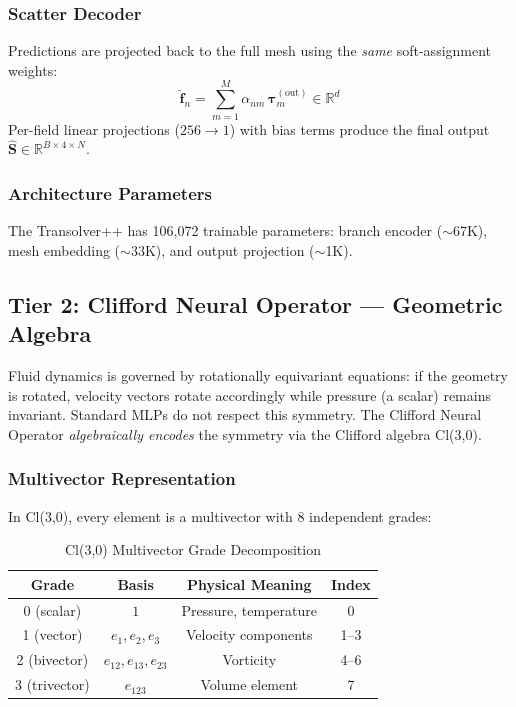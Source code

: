\documentclass[journal]{IEEEtran}
\begin{document}
\subsubsection{Scatter Decoder}
Predictions are projected back to the full mesh using the \emph{same} soft-assignment weights:
\begin{equation}
\hat{\bm{f}}_n = \sum_{m=1}^{M} \alpha_{nm}\,\bm{\tau}_m^{(\text{out})} \in \mathbb{R}^{d}
\label{eq:scatter}
\end{equation}
Per-field linear projections ($256 \to 1$) with bias terms produce the final output $\hat{\bm{S}} \in \mathbb{R}^{B \times 4 \times N}$.

\subsubsection{Architecture Parameters}
The Transolver++ has 106,072 trainable parameters: branch encoder ($\sim$67K), mesh embedding ($\sim$33K), and output projection ($\sim$1K).

\subsection{Tier 2: Clifford Neural Operator --- Geometric Algebra}
\label{sec:clifford}

Fluid dynamics is governed by rotationally equivariant equations: if the geometry is rotated, velocity vectors rotate accordingly while pressure (a scalar) remains invariant. Standard MLPs do not respect this symmetry. The Clifford Neural Operator \cite{brandstetter2023clifford} \emph{algebraically encodes} the symmetry via the Clifford algebra Cl(3,0).

\subsubsection{Multivector Representation}
In Cl(3,0), every element is a multivector with 8 independent grades:

\begin{table}[htbp]
\caption{Cl(3,0) Multivector Grade Decomposition}
\label{tab:grades}
\centering
\begin{tabular}{cccc}
\toprule
\textbf{Grade} & \textbf{Basis} & \textbf{Physical Meaning} & \textbf{Index} \\
\midrule
0 (scalar) & $1$ & Pressure, temperature & 0 \\
1 (vector) & $e_1, e_2, e_3$ & Velocity components & 1--3 \\
2 (bivector) & $e_{12}, e_{13}, e_{23}$ & Vorticity & 4--6 \\
3 (trivector) & $e_{123}$ & Volume element & 7 \\
\bottomrule
\end{tabular}
\end{table}
\end{document}

